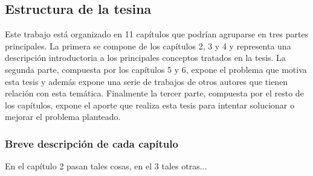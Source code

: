 \subsection{Estructura de la tesina}
\label{estructura}

Este trabajo está organizado en 11 capítulos que podrían agruparse en tres partes principales. La primera se compone de los capítulos 2, 3 y 4 y representa una descripción introductoria a los principales conceptos tratados en la tesis. La segunda parte, compuesta por los capítulos 5 y 6, expone el problema que motiva esta tesis y además expone una serie de trabajos de otros autores que tienen relación con esta temática. Finalmente la tercer parte, compuesta por el resto de los capítulos, expone el aporte que realiza esta tesis para intentar solucionar o mejorar el problema planteado.

\subsubsection{Breve descripción de cada capítulo}

En el capítulo 2 pasan tales cosas, en el 3 tales otras...